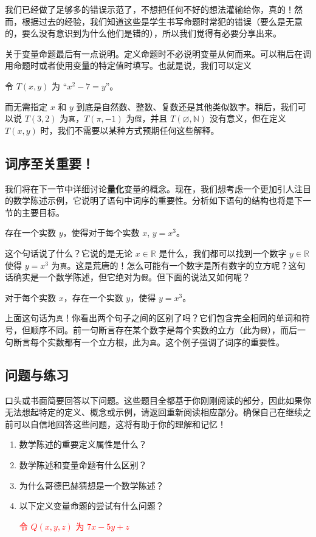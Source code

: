 我们已经做了足够多的错误示范了，不想把任何不好的想法灌输给你，真的！然而，根据过去的经验，我们知道这些是学生书写命题时常犯的错误（要么是无意的，要么没有意识到为什么他们是错的），所以我们觉得有必要分享出来。

关于变量命题最后有一点说明。定义命题时不必说明变量从何而来。可以稍后在调用命题时或者使用变量的特定值时填写。也就是说，我们可以定义
\begin{center}
    令 $T(x, y)$ 为 ``$x^2 - 7 = y$''。
\end{center}
而无需指定 $x$ 和 $y$ 到底是自然数、整数、复数还是其他类似数字。稍后，我们可以说 $T(3, 2)$ 为\verb|真|，$T(\pi, -1)$ 为\verb|假|，并且 $T(\varnothing, \mathbb{N})$ 没有意义，但在定义 $T(x, y)$ 时，我们不需要以某种方式预期任何这些解释。

\subsection{词序至关重要！}

我们将在下一节中详细讨论\textbf{量化}变量的概念。现在，我们想考虑一个更加引人注目的数学陈述示例，它说明了语句中词序的重要性。分析如下语句的结构也将是下一节的主要目标。
\begin{center}
    存在一个实数 $y$，使得对于每个实数 $x$, $y = x^3$。
\end{center}
这个句话说了什么？它说的是无论 $x \in \mathbb{R}$ 是什么，我们都可以找到一个数字 $y \in \mathbb{R}$ 使得 $y = x^3$ 为\verb|真|。这是荒唐的！怎么可能有一个数字是所有数字的立方呢？这句话确实是一个数学陈述，但它绝对为\verb|假|。但下面的说法又如何呢？
\begin{center}
    对于每个实数 $x$，存在一个实数 $y$，使得 $y = x^3$。
\end{center}
上面这句话为\verb|真|！你看出两个句子之间的区别了吗？它们包含完全相同的单词和符号，但顺序不同。前一句断言存在某个数字是每个实数的立方（此为\verb|假|），而后一句断言每个实数都有一个立方根，此为\verb|真|。这个例子强调了词序的重要性。

\subsection{问题与练习}

口头或书面简要回答以下问题。这些题目全都基于你刚刚阅读的部分，因此如果你无法想起特定的定义、概念或示例，请返回重新阅读相应部分。确保自己在继续之前可以自信地回答这些问题，这将有助于你的理解和记忆！

\begin{enumerate}[label=(\arabic*)]
    \item 数学陈述的重要定义属性是什么？
    \item 数学陈述和变量命题有什么区别？
    \item 为什么哥德巴赫猜想是一个数学陈述？
    \item 以下定义变量命题的尝试有什么问题？
        \begin{center}
            \textcolor{red}{令 $Q(x, y, z)$ 为 $7x - 5y + z$}
        \end{center}
\end{enumerate}


